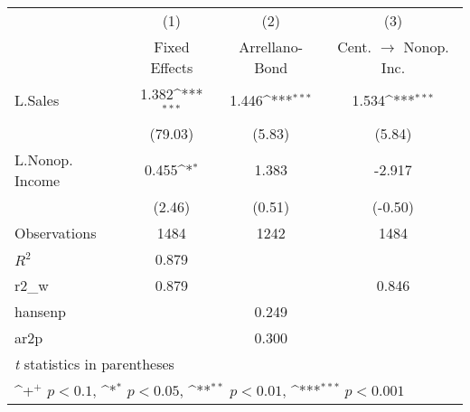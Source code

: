 {
\def\sym#1{\ifmmode^{#1}\else\(^{#1}\)\fi}
\begin{tabular}{l*{3}{c}}
\hline\hline
                    &\multicolumn{1}{c}{(1)}&\multicolumn{1}{c}{(2)}&\multicolumn{1}{c}{(3)}\\
                    &\multicolumn{1}{c}{Fixed Effects}&\multicolumn{1}{c}{Arrellano-Bond}&\multicolumn{1}{c}{Cent. $\rightarrow$ Nonop. Inc.}\\
\hline
L.Sales             &       1.382\sym{***}&       1.446\sym{***}&       1.534\sym{***}\\
                    &     (79.03)         &      (5.83)         &      (5.84)         \\
L.Nonop. Income     &       0.455\sym{*}  &       1.383         &      -2.917         \\
                    &      (2.46)         &      (0.51)         &     (-0.50)         \\
\hline
Observations        &        1484         &        1242         &        1484         \\
\(R^{2}\)           &       0.879         &                     &                     \\
r2\_w                &       0.879         &                     &       0.846         \\
hansenp             &                     &       0.249         &                     \\
ar2p                &                     &       0.300         &                     \\
\hline\hline
\multicolumn{4}{l}{\footnotesize \textit{t} statistics in parentheses}\\
\multicolumn{4}{l}{\footnotesize \sym{+} \(p<0.1\), \sym{*} \(p<0.05\), \sym{**} \(p<0.01\), \sym{***} \(p<0.001\)}\\
\end{tabular}
}
